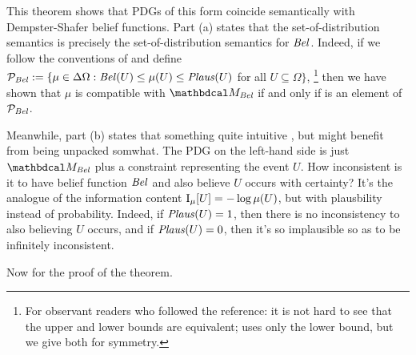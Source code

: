 This theorem shows that PDGs of this form coincide semantically with Dempster-Shafer belief functions. 
Part (a) states that the set-of-distribution semantics is precisely the set-of-distribution semantics for $\mathit{Bel}$.
Indeed, if we follow the conventions of \citet[Theorem 2.6.1]{halpern-RAU} and define $\mathcal P_{\mathit{Bel}} := \{ \mu \in \Delta \Omega : \mathit{Bel}(U) \le \mu(U) \le \mathit{Plaus}(U)$ for all $U \subseteq \Omega \}$, 
\unskip\footnote{For observant readers who followed the reference: it is not hard to see that the upper and lower bounds are equivalent; \citet{halpern-RAU} uses only the lower bound, but we give both for symmetry.}
then we have shown that $\mu$ is compatible with $\dg M_{\Bel}$ if and only if is an element of $\mathcal P_{\mathit{Bel}}$. 

Meanwhile, part (b) states that something quite intuitive
%
\unskip, but might benefit from being unpacked somwhat.  The PDG on the left-hand side is just $\dg M_{\Bel}$ plus a constraint representing the event $U$. 
How inconsistent is it to have belief function $\mathit{Bel}$ and also believe $U$ occurs with certainty? 
It's the analogue of the information content $\operatorname{\mathrm{I}}_\mu[U] = - \log \mu(U)$, but with plausbility instead of probability. 
Indeed, if $\mathit{Plaus}(U) = 1$, then there is no inconsistency to also believing $U$ occurs, and if $\mathit{Plaus}(U) = 0$, then it's so implausible so as to be infinitely inconsistent. 

Now for the proof of the theorem.


